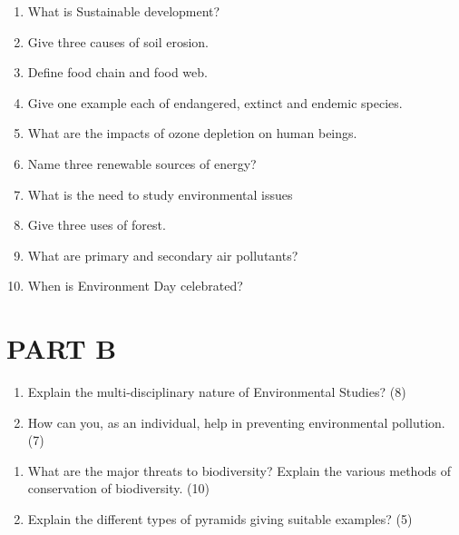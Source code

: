 \documentclass[12pt,a4paper]{article}
\begin{document}
\begin{questions}
    \item \begin{enumerate}[label=(\alph*), leftmargin=2em]
        \item  What is Sustainable development?
        \item Give three causes of soil erosion.
        \item Define food chain and food web.
        \item Give one example each of endangered, extinct and endemic species.
        \item What are the impacts of ozone depletion on human beings.
        \item Name three renewable sources of energy?
        \item What is the need to study environmental issues
        \item Give three uses of forest.
        \item What are primary and secondary air pollutants?
        \item When is Environment Day celebrated?
    \end{enumerate}

\vspace{1em}

\section*{\textbf{PART B}}

    \item \begin{enumerate}[label=(\alph*), leftmargin=2em]
        \item Explain the multi-disciplinary nature of Environmental Studies? \hfill (8)
        \item How can you, as an individual, help in preventing environmental pollution. \hfill (7)
    \end{enumerate}

    \vspace{\baselineskip}
    
    \item \begin{enumerate}[label=(\alph*), leftmargin=2em]
        \item What are the major threats to biodiversity? Explain the various methods of conservation of biodiversity. \hfill (10)
        \item Explain the different types of pyramids giving suitable examples? \hfill (5)
    \end{enumerate}


\end{questions}
\end{document}
